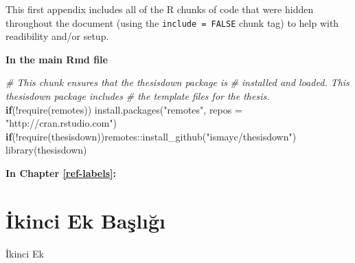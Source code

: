\documentclass[12pt,twoside]{deuthesis}
\newenvironment{Shaded}{\begin{snugshade}}{\end{snugshade}}
\newcommand{\AttributeTok}[1]{\textcolor[rgb]{0.77,0.63,0.00}{#1}}
\newcommand{\CommentTok}[1]{\textcolor[rgb]{0.56,0.35,0.01}{\textit{#1}}}
\newcommand{\ControlFlowTok}[1]{\textcolor[rgb]{0.13,0.29,0.53}{\textbf{#1}}}
\newcommand{\FunctionTok}[1]{\textcolor[rgb]{0.00,0.00,0.00}{#1}}
\newcommand{\NormalTok}[1]{#1}
\newcommand{\SpecialCharTok}[1]{\textcolor[rgb]{0.00,0.00,0.00}{#1}}
\newcommand{\StringTok}[1]{\textcolor[rgb]{0.31,0.60,0.02}{#1}}
\begin{document}
This first appendix includes all of the R chunks of code that were hidden throughout the document (using the \texttt{include\ =\ FALSE} chunk tag) to help with readibility and/or setup.

\textbf{In the main Rmd file}
\begin{Shaded}
\begin{Highlighting}[]
\CommentTok{\# This chunk ensures that the thesisdown package is}
\CommentTok{\# installed and loaded. This thesisdown package includes}
\CommentTok{\# the template files for the thesis.}
 \ControlFlowTok{if}\NormalTok{(}\SpecialCharTok{!}\FunctionTok{require}\NormalTok{(remotes)) }\FunctionTok{install.packages}\NormalTok{(}\StringTok{"remotes"}\NormalTok{, }\AttributeTok{repos =} \StringTok{"http://cran.rstudio.com"}\NormalTok{)}
 \ControlFlowTok{if}\NormalTok{(}\SpecialCharTok{!}\FunctionTok{require}\NormalTok{(thesisdown))remotes}\SpecialCharTok{::}\FunctionTok{install\_github}\NormalTok{(}\StringTok{"ismayc/thesisdown"}\NormalTok{)}
 \FunctionTok{library}\NormalTok{(thesisdown)}
\end{Highlighting}
\end{Shaded}
\textbf{In Chapter \ref{ref-labels}:}

\hypertarget{ikinci-ek-baux15flux131ux11fux131}{%
\chapter{İkinci Ek Başlığı}\label{ikinci-ek-baux15flux131ux11fux131}}

İkinci Ek
\end{document}

